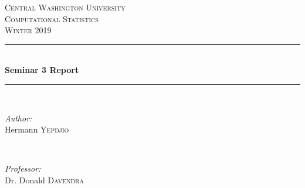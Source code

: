 \documentclass[12pt]{article}
\begin{document}
	
	\begin{titlepage}
		
		\newcommand{\HRule}{\rule{\linewidth}{0.5mm}} %
		
		\center %
		
		
		\textsc{\LARGE Central Washington University}\\[1.5cm] %
		\textsc{\Large Computational Statistics}\\[0.5cm] %
		\textsc{\large Winter 2019}\\[0.5cm] %
		
		
		\HRule \\[0.4cm]
		{ \huge \bfseries Seminar 3 Report}\\[0.4cm] %
		\HRule \\[1.5cm]
		
		
		\begin{minipage}{0.4\textwidth}
			\begin{flushleft} \large
				\emph{Author:}\\
				Hermann \textsc{Yepdjio} %
			\end{flushleft}
		\end{minipage}
		~
		\begin{minipage}{0.4\textwidth}
			\begin{flushright} \large
				\emph{Professor:} \\
				Dr. Donald \textsc{Davendra} %
			\end{flushright}
		\end{minipage}\\[1cm]
		

\end{titlepage}
\end{document}
